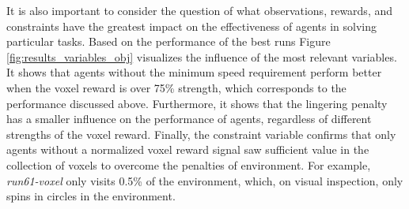         It is also important to consider the question of what observations, rewards, and constraints have the greatest impact on the effectiveness of agents in solving particular tasks.
        Based on the performance of the best runs Figure \ref{fig:results_variables_obj} visualizes the influence of the most relevant variables. 
        It shows that agents without the minimum speed requirement perform better when the voxel reward is over 75\% strength, which corresponds to the performance discussed above.
        Furthermore, it shows that the lingering penalty has a smaller influence on the performance of agents, regardless of different strengths of the voxel reward. Finally, the constraint variable confirms that only agents without a normalized voxel reward signal saw sufficient value in the collection of voxels to overcome the penalties of environment. For example, \textit{run61-voxel} only visits 0.5\% of the environment, which, on visual inspection, only spins in circles in the environment.
        
    
        
        
        
